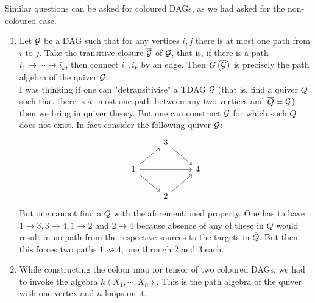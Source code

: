 \begin{rmk}
Similar questions can be asked for coloured DAGs, as we had asked for the non-coloured case.
\end{rmk}
\begin{rmk}
\begin{enumerate}[leftmargin=*]
\item Let ${\mathcal{G}}$ be a DAG such that for any vertices $i,j$ there is at most one path from $i$ to $j$. Take the transitive closure $\overline{{\mathcal{G}}}$ of ${\mathcal{G}}$, that is, if there is a path $i_1\to\cdots\to i_k$, then connect $i_1,i_k$ by an edge. Then $G\left(\overline{{\mathcal{G}}}\right)$ is precisely the path algebra of the quiver ${\mathcal{G}}$. \\
I was thinking if one can "detransitivise" a TDAG ${\mathcal{G}}$ (that is, find a quiver $Q$ such that there is at most one path between any two vertices and $\overline{Q} = {\mathcal{G}}$) then we bring in quiver theory. But one can construct ${\mathcal{G}}$ for which such $Q$ does not exist. In fact consider the following quiver ${\mathcal{G}}$:
\[\begin{tikzcd}
	& 3 \\
	1 && 4 \\
	& 2
	\arrow[from=2-1, to=1-2]
	\arrow[from=1-2, to=2-3]
	\arrow[from=2-1, to=3-2]
	\arrow[from=3-2, to=2-3]
	\arrow[from=2-1, to=2-3]
\end{tikzcd}\]
But one cannot find a $Q$ with the aforementioned property. One has to have $1\to 3, 3\to 4, 1\to 2$ and $2\to 4$ because absence of any of these in $Q$ would result in no path from the respective sources to the targets in $\overline Q$. But then this forces two paths $1\rightsquigarrow 4$, one through $2$ and $3$ each.
\item While constructing the colour map for tensor of two coloured DAGs, we had to invoke the algebra $k\left<X_1,\cdots,X_n\right>$. This is the path algebra of the quiver with one vertex and $n$ loops on it.
\end{enumerate}
\end{rmk}





